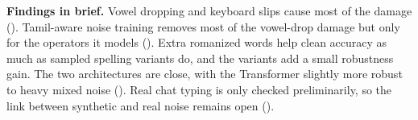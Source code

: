 \textbf{Findings in brief.}
Vowel dropping and keyboard slips cause most of the damage ().
Tamil-aware noise training removes most of the vowel-drop damage but only for the operators it models ().
Extra romanized words help clean accuracy as much as sampled spelling variants do, and the variants add a small robustness gain.
The two architectures are close, with the Transformer slightly more robust to heavy mixed noise ().
Real chat typing is only checked preliminarily, so the link between synthetic and real noise remains open ().
